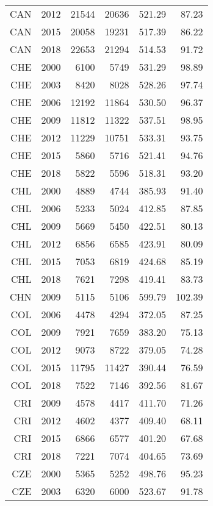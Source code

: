 \begin{longtable}{|r|r|r|r|r|r|}
    CAN   & 2012  & 21544 & 20636 & 521.29 & 87.23 \\
    CAN   & 2015  & 20058 & 19231 & 517.39 & 86.22 \\
    CAN   & 2018  & 22653 & 21294 & 514.53 & 91.72 \\
    CHE   & 2000  & 6100  & 5749  & 531.29 & 98.89 \\
    CHE   & 2003  & 8420  & 8028  & 528.26 & 97.74 \\
    CHE   & 2006  & 12192 & 11864 & 530.50 & 96.37 \\
    CHE   & 2009  & 11812 & 11322 & 537.51 & 98.95 \\
    CHE   & 2012  & 11229 & 10751 & 533.31 & 93.75 \\
    CHE   & 2015  & 5860  & 5716  & 521.41 & 94.76 \\
    CHE   & 2018  & 5822  & 5596  & 518.31 & 93.20 \\
    CHL   & 2000  & 4889  & 4744  & 385.93 & 91.40 \\
    CHL   & 2006  & 5233  & 5024  & 412.85 & 87.85 \\
    CHL   & 2009  & 5669  & 5450  & 422.51 & 80.13 \\
    CHL   & 2012  & 6856  & 6585  & 423.91 & 80.09 \\
    CHL   & 2015  & 7053  & 6819  & 424.68 & 85.19 \\
    CHL   & 2018  & 7621  & 7298  & 419.41 & 83.73 \\
    CHN   & 2009  & 5115  & 5106  & 599.79 & 102.39 \\
    COL   & 2006  & 4478  & 4294  & 372.05 & 87.25 \\
    COL   & 2009  & 7921  & 7659  & 383.20 & 75.13 \\
    COL   & 2012  & 9073  & 8722  & 379.05 & 74.28 \\
    COL   & 2015  & 11795 & 11427 & 390.44 & 76.59 \\
    COL   & 2018  & 7522  & 7146  & 392.56 & 81.67 \\
    CRI   & 2009  & 4578  & 4417  & 411.70 & 71.26 \\
    CRI   & 2012  & 4602  & 4377  & 409.40 & 68.11 \\
    CRI   & 2015  & 6866  & 6577  & 401.20 & 67.68 \\
    CRI   & 2018  & 7221  & 7074  & 404.65 & 73.69 \\
    CZE   & 2000  & 5365  & 5252  & 498.76 & 95.23 \\
    CZE   & 2003  & 6320  & 6000  & 523.67 & 91.78 \\

\end{longtable}
